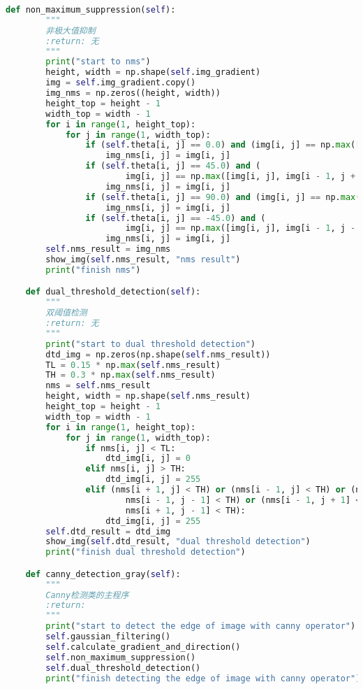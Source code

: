 \documentclass{hitreport}
\begin{document}
\begin{lstlisting}[language=python]
    def non_maximum_suppression(self):
        """
        非极大值抑制
        :return: 无
        """
        print("start to nms")
        height, width = np.shape(self.img_gradient)
        img = self.img_gradient.copy()
        img_nms = np.zeros((height, width))
        height_top = height - 1
        width_top = width - 1
        for i in range(1, height_top):
            for j in range(1, width_top):
                if (self.theta[i, j] == 0.0) and (img[i, j] == np.max([img[i, j], img[i + 1, j], img[i - 1, j]])):
                    img_nms[i, j] = img[i, j]
                if (self.theta[i, j] == 45.0) and (
                        img[i, j] == np.max([img[i, j], img[i - 1, j + 1], img[i + 1, j - 1]])):
                    img_nms[i, j] = img[i, j]
                if (self.theta[i, j] == 90.0) and (img[i, j] == np.max([img[i, j], img[i, j + 1], img[i, j - 1]])):
                    img_nms[i, j] = img[i, j]
                if (self.theta[i, j] == -45.0) and (
                        img[i, j] == np.max([img[i, j], img[i - 1, j - 1], img[i + 1, j + 1]])):
                    img_nms[i, j] = img[i, j]
        self.nms_result = img_nms
        show_img(self.nms_result, "nms result")
        print("finish nms")

    def dual_threshold_detection(self):
        """
        双阈值检测
        :return: 无
        """
        print("start to dual threshold detection")
        dtd_img = np.zeros(np.shape(self.nms_result))
        TL = 0.15 * np.max(self.nms_result)
        TH = 0.3 * np.max(self.nms_result)
        nms = self.nms_result
        height, width = np.shape(self.nms_result)
        height_top = height - 1
        width_top = width - 1
        for i in range(1, height_top):
            for j in range(1, width_top):
                if nms[i, j] < TL:
                    dtd_img[i, j] = 0
                elif nms[i, j] > TH:
                    dtd_img[i, j] = 255
                elif (nms[i + 1, j] < TH) or (nms[i - 1, j] < TH) or (nms[i, j + 1] < TH) or (nms[i, j - 1] < TH) or (
                        nms[i - 1, j - 1] < TH) or (nms[i - 1, j + 1] < TH) or (nms[i + 1, j + 1] < TH) or (
                        nms[i + 1, j - 1] < TH):
                    dtd_img[i, j] = 255
        self.dtd_result = dtd_img
        show_img(self.dtd_result, "dual threshold detection")
        print("finish dual threshold detection")

    def canny_detection_gray(self):
        """
        Canny检测类的主程序
        :return:
        """
        print("start to detect the edge of image with canny operator")
        self.gaussian_filtering()
        self.calculate_gradient_and_direction()
        self.non_maximum_suppression()
        self.dual_threshold_detection()
        print("finish detecting the edge of image with canny operator")


\end{lstlisting}
\end{document}
